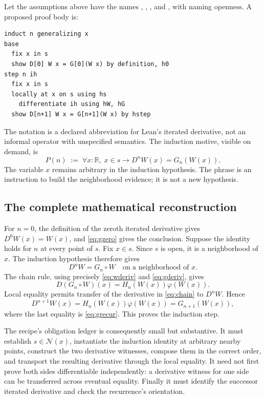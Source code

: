 \documentclass[11pt,letterpaper]{article}
\newcommand{\code}[1]{\texttt{\detokenize{#1}}}
\newcommand{\R}{\mathbb R}
\theoremstyle{remark}
\begin{document}
Let the assumptions above have the names \code{hW}, \code{h0}, \code{hG}, and \code{hstep}, with \code{hs} naming openness. A proposed proof body is:
\par\noindent\begin{minipage}{\linewidth}
\begin{lstlisting}[caption={Proposed Loom proof of the frozen statement \eqref{eq:autonomous-goal}.}]
induct n generalizing x
base
  fix x in s
  show D[0] W x = G[0](W x) by definition, h0
step n ih
  fix x in s
  locally at x on s using hs
    differentiate ih using hW, hG
  show D[n+1] W x = G[n+1](W x) by hstep
\end{lstlisting}
\end{minipage}\par
The notation \code{D[n]} is a declared abbreviation for Lean's iterated derivative, not an informal operator with unspecified semantics. The induction motive, visible on demand, is
\[
  P(n)\;:=\;\forall x:\R,\;x\in s\to D^nW(x)=G_n(W(x)).
\]
The variable $x$ remains arbitrary in the induction hypothesis. The phrase \code{locally at x on s} is an instruction to build the neighborhood evidence; it is not a new hypothesis.

\subsection{The complete mathematical reconstruction}

For $n=0$, the definition of the zeroth iterated derivative gives $D^0W(x)=W(x)$, and \eqref{eq:gzero} gives the conclusion. Suppose the identity holds for $n$ at every point of $s$. Fix $x\in s$. Since $s$ is open, it is a neighborhood of $x$. The induction hypothesis therefore gives
\begin{equation}
 D^nW = G_n\circ W\quad\text{on a neighborhood of }x.
 \label{eq:localidentity}
\end{equation}
The chain rule, using precisely \eqref{eq:wderiv} and \eqref{eq:gderiv}, gives
\begin{equation}
 D(G_n\circ W)(x)=H_n(W(x))\varphi(W(x)).
 \label{eq:chain}
\end{equation}
Local equality permits transfer of the derivative in \eqref{eq:chain} to $D^nW$. Hence
\[
 D^{n+1}W(x)
 =H_n(W(x))\varphi(W(x))
 =G_{n+1}(W(x)),
\]
where the last equality is \eqref{eq:grecur}. This proves the induction step.

The recipe's obligation ledger is consequently small but substantive. It must establish $s\in\mathcal N(x)$, instantiate the induction identity at arbitrary nearby points, construct the two derivative witnesses, compose them in the correct order, and transport the resulting derivative through the local equality. It need not first prove both sides differentiable independently: a derivative witness for one side can be transferred across eventual equality. Finally it must identify the successor iterated derivative and check the recurrence's orientation.
\end{document}
